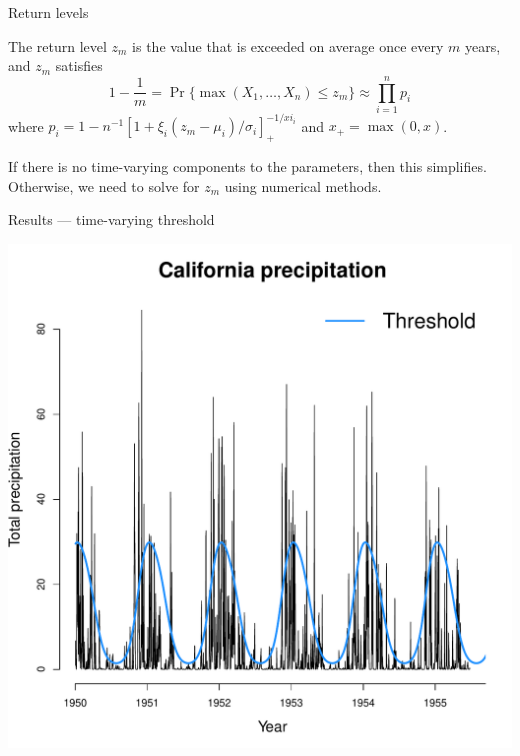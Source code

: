 \documentclass[mathserif, 11pt, t]{beamer}
\begin{document}
\begin{frame}{Return levels}

The return level $z_m$ is the value that is exceeded on average once every $m$ years, and $z_m$ satisfies
\[ 1-\frac{1}{m} = \Pr\{\max(X_1,\ldots,X_n)\leq z_m\} \approx \prod_{i=1}^n p_i \]
where $p_i = 1 - n^{-1}[1+\xi_i(z_m-\mu_i)/\sigma_i]_{+}^{-1/xi_i}$ and $x_+=\max(0,x)$.
\bigskip

If there is no time-varying components to the parameters, then this simplifies. Otherwise, we need to solve for $z_m$ using numerical methods.
\end{frame}



\begin{frame}{Results --- time-varying threshold}
\begin{center}
\includegraphics[scale=0.30]{../figs/threshold.pdf}
\end{center}
\end{frame}
\end{document}

